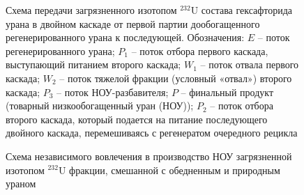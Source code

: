 \begin{figure}[ht]
  \caption{Схема передачи загрязненного изотопом $^{232}$U состава гексафторида урана в двойном каскаде от первой партии дообогащенного регенерированного урана к последующей. Обозначения: $E$ -- поток регенерированного урана; $P_1$ -- поток отбора первого каскада, выступающий питанием второго каскада; $W_1$ -- поток отвала первого каскада; $W_2$ -- поток тяжелой фракции (условный «отвал») второго каскада; $P_3$ -- поток НОУ-разбавителя; $P$ -- финальный продукт (товарный низкообогащенный уран (НОУ)); $P_2$ -- поток отбора второго каскада, который подается на питание последующего двойного каскада, перемешиваясь с регенератом очередного рецикла}\label{P2utilizationRingautoref}
\end{figure}

\begin{figure}[ht]
  \caption{Схема независимого вовлечения в производство НОУ загрязненной изотопом $^{232}$U фракции, смешанной с обедненным и природным ураном}\label{P2utilizationautoref}
\end{figure}


